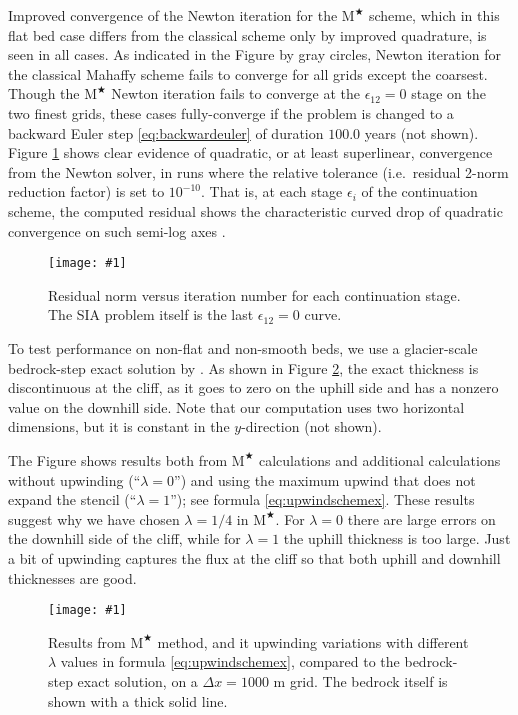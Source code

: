 \documentclass[review,letterpaper]{igs}
\newcommand{\onecol}[1]{\texttt{[image: \#1]}}
\newcommand\eps{\epsilon}
\newcommand{\Mstar}{$\text{M}^{\bigstar}$\xspace}
\begin{document}
Improved convergence of the Newton iteration for the \Mstar scheme, which in this flat bed case differs from the classical scheme only by improved quadrature, is seen in all cases.  As indicated in the Figure by gray circles, Newton iteration for the classical Mahaffy scheme fails to converge for all grids except the coarsest.  Though the \Mstar Newton iteration fails to converge at the $\eps_{12}=0$ stage on the two finest grids, these cases fully-converge if the problem is changed to a backward Euler step \eqref{eq:backwardeuler} of duration $100.0$ years (not shown).  Figure \ref{fig:newtonconv} shows clear evidence of quadratic, or at least superlinear, convergence from the Newton solver, in runs where the relative tolerance (i.e.~residual 2-norm reduction factor) is set to $10^{-10}$.  That is, at each stage $\eps_i$ of the continuation scheme, the computed residual shows the characteristic curved drop of quadratic convergence on such semi-log axes \citep{Kelley2003}.

\begin{figure}[ht]
\onecol{newtonconv.pdf}
\caption{Residual norm versus iteration number for each continuation stage.  The SIA problem itself is the last $\eps_{12}=0$ curve.}
\label{fig:newtonconv}
\end{figure}

To test performance on non-flat and non-smooth beds, we use a glacier-scale bedrock-step exact solution by \cite{JaroschSchoofAnslow2013}.  As shown in Figure \ref{fig:bedstepprofiles}, the exact thickness is discontinuous at the cliff, as it goes to zero on the uphill side and has a nonzero value on the downhill side.  Note that our computation uses two horizontal dimensions, but it is constant in the $y$-direction (not shown).

The Figure shows results both from \Mstar calculations and additional calculations without upwinding (``$\lambda=0$'') and using the maximum upwind that does not expand the stencil (``$\lambda=1$''); see formula \eqref{eq:upwindschemex}.  These results suggest why we have chosen $\lambda=1/4$ in \Mstar.  For $\lambda=0$ there are large errors on the downhill side of the cliff, while for $\lambda=1$ the uphill thickness is too large.  Just a bit of upwinding captures the flux at the cliff so that both uphill and downhill thicknesses are good.

\begin{figure}[ht]
\onecol{bedstepprofiles.pdf}
\caption{Results from \Mstar method, and it upwinding variations with different $\lambda$ values in formula \eqref{eq:upwindschemex}, compared to the bedrock-step exact solution, on a $\Delta x=1000$ m grid.  The bedrock itself is shown with a thick solid line.}
\label{fig:bedstepprofiles}
\end{figure}
\end{document}
